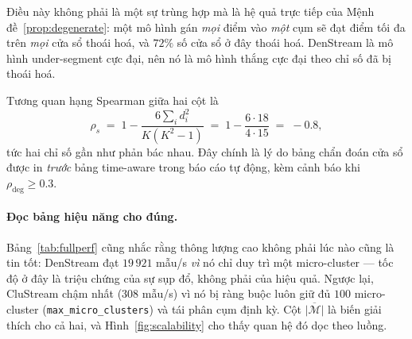 \documentclass[11pt,a4paper]{article}
\theoremstyle{remark}
\begin{document}
Điều này không phải là một sự trùng hợp mà là hệ quả trực tiếp của
Mệnh đề~\ref{prop:degenerate}: một mô hình gán \emph{mọi} điểm vào \emph{một}
cụm sẽ đạt điểm tối đa trên \emph{mọi} cửa sổ thoái hoá, và $72\%$ số cửa sổ ở
đây thoái hoá. DenStream là mô hình under-segment cực đại, nên nó là mô hình
thắng cực đại theo chỉ số đã bị thoái hoá.

Tương quan hạng Spearman giữa hai cột là
\begin{equation}
  \rho_s \;=\; 1 - \frac{6\sum_i d_i^2}{K(K^2-1)}
  \;=\; 1 - \frac{6 \cdot 18}{4 \cdot 15} \;=\; -0.8,
\end{equation}
tức hai chỉ số gần như phản bác nhau. Đây chính là lý do bảng chẩn đoán cửa sổ
được in \emph{trước} bảng time-aware trong báo cáo tự động, kèm cảnh báo khi
$\rho_{\text{deg}} \ge 0.3$.

\paragraph{Đọc bảng hiệu năng cho đúng.}
Bảng~\ref{tab:fullperf} cũng nhắc rằng thông lượng cao không phải lúc nào cũng
là tin tốt: DenStream đạt $19\,921$ mẫu/s \emph{vì} nó chỉ duy trì một
micro-cluster --- tốc độ ở đây là triệu chứng của sự sụp đổ, không phải của
hiệu quả. Ngược lại, CluStream chậm nhất ($308$ mẫu/s) vì nó bị ràng buộc luôn
giữ đủ $100$ micro-cluster (\texttt{max\_micro\_clusters}) và tái phân cụm định
kỳ. Cột $\overline{|\mathcal{M}|}$ là biến giải thích cho cả hai, và
Hình~\ref{fig:scalability} cho thấy quan hệ đó dọc theo luồng.
\end{document}
